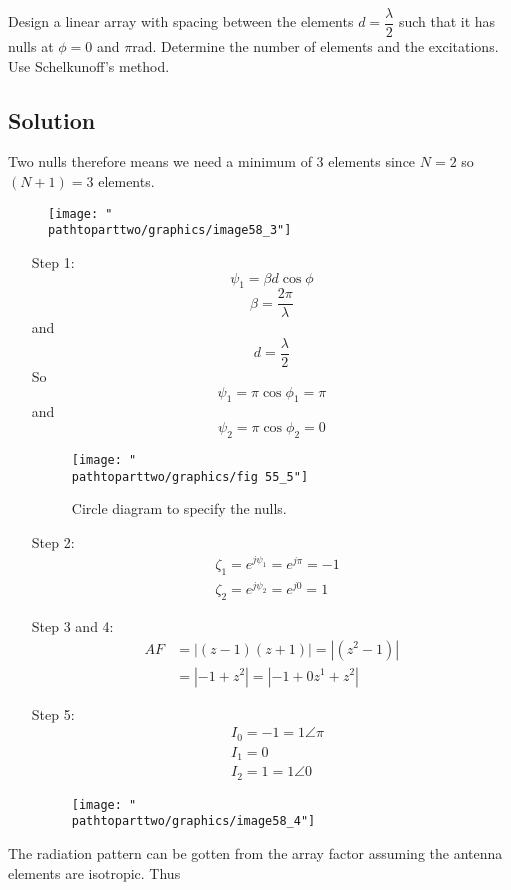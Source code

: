 \begin{exmp}
 Design a linear array with spacing between the elements  $d=\dfrac{\lambda}{2}$ such that it has nulls at $\phi=0$ and $\pi$rad. Determine the number of elements and the excitations. Use Schelkunoff's method.
\subsection*{\centering Solution}
Two nulls therefore means we need a minimum of 3 elements since $N=2$ so $(N+1)=3$ elements.
\begin{figure}[h]
 \centering
\texttt{[image: "\\pathtoparttwo/graphics/image58\_3"]}
\caption{}
\label{fig:fig}
\end{figure}
\begin{enumerate}
\item[Step 1:] $$\psi_{1}=\beta d\cos\phi$$
 $$\beta=\dfrac{2\pi}{\lambda}$$ and $$d=\dfrac{\lambda}{2}$$
So $$\psi_{1}=\pi\cos\phi_{1}=\pi$$
and $$\psi_{2}=\pi\cos\phi_{2}=0$$
\begin{figure}[h]
\centering
\texttt{[image: "\\pathtoparttwo/graphics/fig 55\_5"]}
\caption{Circle diagram to specify the nulls.}
\label{fig:fig-55_5}
\end{figure}
\item[Step 2:] \begin{align*}
&\zeta_1 = e^{j\psi_{1}}=e^{j\pi}=-1\\
&\zeta_{2} = e^{j\psi_{2}}=e^{j0}=1
\end{align*}
\item[Step 3 and 4:]  \begin{align}
AF &=|(z-1)(z+1)|=|(z^{2}-1)|\nonumber\\
&=|-1+z^{2}|=|-1+0z^{1}+z^{2}|\nonumber	  
\end{align}	    	  
\item[Step 5:]  \begin{align*}
&I_{0}=-1=1\angle\pi\\
&I_{1}=0\\
&I_{2}=1=1\angle0
\end{align*}
\begin{figure}[h]
\centering
\texttt{[image: "\\pathtoparttwo/graphics/image58\_4"]}
\label{fig:fig-55_6}
\end{figure}
\end{enumerate}
The radiation pattern can be gotten from the array factor assuming the antenna elements are isotropic. Thus


\end{exmp}
